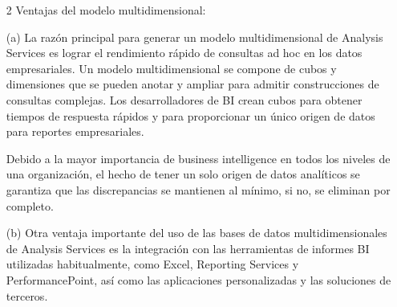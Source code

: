 \documentclass[twoside,twocolumn]{article}
\begin{document}
\begin{enumerate}
\begin{enumerate}
\item[2] Ventajas del modelo multidimensional: \\ 
\item[(a)]La razón principal para generar un modelo multidimensional de Analysis Services es lograr el rendimiento rápido de consultas ad hoc en los datos empresariales. Un modelo multidimensional se compone de cubos y dimensiones que se pueden anotar y ampliar para admitir construcciones de consultas complejas. Los desarrolladores de BI crean cubos para obtener tiempos de respuesta rápidos y para proporcionar un único origen de datos para reportes empresariales.

Debido a la mayor importancia de business intelligence en todos los niveles de una organización, el hecho de tener un solo origen de datos analíticos se garantiza que las discrepancias se mantienen al mínimo, si no, se eliminan por completo.
\item[(b)]Otra ventaja importante del uso de las bases de datos multidimensionales de Analysis Services es la integración con las herramientas de informes BI utilizadas habitualmente, como Excel, Reporting Services y PerformancePoint, así como las aplicaciones personalizadas y las soluciones de terceros.




\end{enumerate}
    
\end{enumerate}








\end{document}
